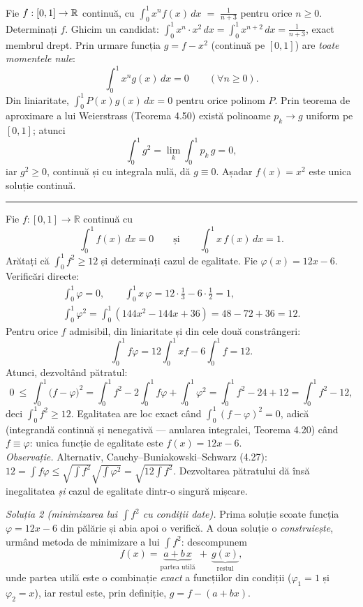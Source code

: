Fie $f : [0,1] \to \mathbb{R}$ continuă, cu $\displaystyle\int_0^1 x^n f(x)\,dx \;=\; \frac{1}{n+3}$ pentru orice $n \ge 0$. Determinați $f$.
\sol Ghicim un candidat: $\displaystyle\int_0^1 x^n\cdot x^2\,dx = \int_0^1 x^{n+2}\,dx = \frac{1}{n+3}$, exact membrul drept. Prin urmare funcția $g = f - x^2$ (continuă pe $[0,1]$) are \emph{toate momentele nule}:
\[
\int_0^1 x^n g(x)\,dx = 0 \qquad (\forall n \ge 0).
\]
Din liniaritate, $\int_0^1 P(x)g(x)\,dx = 0$ pentru orice polinom $P$. Prin teorema de aproximare a lui Weierstrass (Teorema 4.50) există polinoame $p_k \to g$ uniform pe $[0,1]$; atunci
\[
\int_0^1 g^2 = \lim_k \int_0^1 p_k\,g = 0,
\]
iar $g^2 \ge 0$, continuă și cu integrala nulă, dă $g \equiv 0$. Așadar $\boxed{f(x) = x^2}$ este unica soluție continuă.
\vspace{1mm}\hrule

Fie $f:[0,1]\to\mathbb{R}$ continuă cu
\[ \int_0^1f(x)\,dx=0\qquad\text{și}\qquad\int_0^1x\,f(x)\,dx=1 . \]
Arătați că $\displaystyle\int_0^1f^2\ge12$ și determinați cazul de egalitate.
\sol Fie $\varphi(x)=12x-6$. Verificări directe:
\[ \begin{gathered} \int_0^1\varphi=0,\qquad \int_0^1x\,\varphi=12\cdot\frac13-6\cdot\frac12=1,\\ \int_0^1\varphi^2=\int_0^1(144x^2-144x+36)=48-72+36=12 . \end{gathered} \]
Pentru orice $f$ admisibil, din liniaritate și din cele două constrângeri:
\[ \int_0^1f\varphi=12\int_0^1xf-6\int_0^1f=12 . \]
Atunci, dezvoltând pătratul:
\[ 0\ \le\ \int_0^1\bigl(f-\varphi\bigr)^2=\int_0^1f^2-2\!\int_0^1f\varphi+\int_0^1\varphi^2=\int_0^1f^2-24+12=\int_0^1f^2-12 , \]
deci $\int_0^1f^2\ge12$. Egalitatea are loc exact când $\int_0^1(f-\varphi)^2=0$, adică (integrandă continuă și nenegativă --- anularea integralei, Teorema 4.20) când $f\equiv\varphi$: unica funcție de egalitate este $f(x)=12x-6$.\\[2pt]
\emph{Observație.} Alternativ, Cauchy--Buniakowski--Schwarz (4.27): $12=\int f\varphi\le\sqrt{\int f^2}\sqrt{\int\varphi^2}=\sqrt{12\int f^2}$. Dezvoltarea pătratului dă însă inegalitatea \emph{și} cazul de egalitate dintr-o singură mișcare.

\emph{Soluția 2 (minimizarea lui $\int f^{2}$ cu condiții date).} Prima soluție scoate funcția $\varphi=12x-6$ din pălărie și abia apoi o verifică. A doua soluție o \emph{construiește}, urmând metoda de minimizare a lui $\int f^{2}$: descompunem
\[ f(x)=\underbrace{a+b\,x}_{\text{partea utilă}}\ +\ \underbrace{g(x)}_{\text{restul}} , \]
unde partea utilă este o combinație \emph{exact} a funcțiilor din condiții ($\varphi_{1}=1$ și $\varphi_{2}=x$), iar restul este, prin definiție, $g=f-(a+bx)$.

